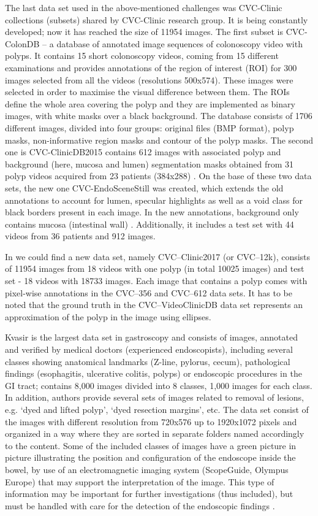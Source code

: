 \documentclass[preprint]{article}
\begin{document}
The last data set used in the above-mentioned challenges was CVC-Clinic collections (subsets) shared by CVC-Clinic research group. It is being constantly developed; now it has reached the size of 11954 images. The first subset is CVC-ColonDB -- a database of annotated image sequences of colonoscopy video with polyps. It contains 15 short colonoscopy videos, coming from 15 different examinations and provides annotations of the region of interest (ROI)  for 300 images selected from all the videos (resolutions 500x574). These images were selected in order to maximise the visual difference between them. The ROIs define the whole area covering the polyp and they are implemented as binary images, with white masks over a black background. The database consists of 1706 different images, divided into four groups: original files (BMP format), polyp masks, non-informative region masks and contour of the polyp masks. The second one is CVC-ClinicDB2015 contains 612 images with associated polyp and background (here, mucosa and lumen) segmentation masks obtained from 31 polyp videos acquired from 23 patients (384x288) \cite{bernal2012}. On the base of these two data sets, the new one CVC-EndoSceneStill was created, which extends the old annotations to account for lumen, specular highlights as well as a void class for black borders present in each image. In the new annotations, background only contains mucosa (intestinal wall) \cite{Vazquez17}. Additionally, it includes a test set with 44 videos from 36 patients and 912 images.

In \cite{cvc3} we could find a new data set, namely CVC--Clinic2017 (or CVC--12k), consists of 11954 images  from 18 videos with one polyp (in total 10025 images) and test set - 18 videos with 18733 images. Each image that contains a polyp comes with pixel-wise annotations in the CVC--356 and CVC--612 data sets. It has to be noted that the ground truth in the CVC--VideoClinicDB data set represents an approximation  of the polyp in the image using ellipses. 

Kvasir is the largest data set in gastroscopy and consists of images, annotated and verified by medical doctors (experienced endoscopists), including several classes showing anatomical landmarks (Z-line, pylorus, cecum), pathological findings (esophagitis, ulcerative colitis, polyps) or endoscopic procedures in the GI tract; contains 8,000 images divided into 8 classes, 1,000 images for each class. In addition, authors provide several sets of images related to removal of lesions, e.g. `dyed and lifted polyp', `dyed resection margins', etc. The data set consist of the images with different resolution from 720x576 up to 1920x1072 pixels and organized in a way where they are sorted in separate folders named accordingly to the content. Some of the included classes of images have a green picture in picture illustrating the position and configuration of the endoscope inside the bowel, by use of an electromagnetic imaging system (ScopeGuide, Olympus Europe) that may support the interpretation of the image. This type of information may be important for further investigations (thus included), but must be handled with care for the detection of the endoscopic findings \cite{kvasir}. 
\end{document}
